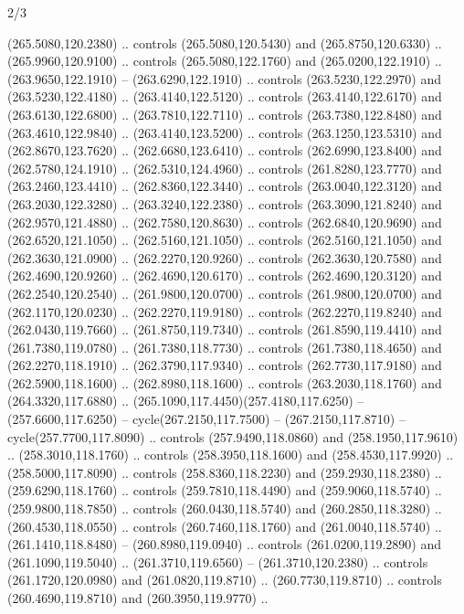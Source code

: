 \begin{flagdescription}{2/3}
\begin{scope}[xshift=0.5\flaglength,yshift=0.5\flagwidth,scale=\flagwidth/259.2]
\begin{scope}[y=0.8pt, x=0.8pt, yscale=-1,shift={(-243,-162)}]
      (265.5080,120.2380) .. controls (265.5080,120.5430) and (265.8750,120.6330) ..
      (265.9960,120.9100) .. controls (265.5080,122.1760) and (265.0200,122.1910) ..
      (263.9650,122.1910) -- (263.6290,122.1910) .. controls (263.5230,122.2970) and
      (263.5230,122.4180) .. (263.4140,122.5120) .. controls (263.4140,122.6170) and
      (263.6130,122.6800) .. (263.7810,122.7110) .. controls (263.7380,122.8480) and
      (263.4610,122.9840) .. (263.4140,123.5200) .. controls (263.1250,123.5310) and
      (262.8670,123.7620) .. (262.6680,123.6410) .. controls (262.6990,123.8400) and
      (262.5780,124.1910) .. (262.5310,124.4960) .. controls (261.8280,123.7770) and
      (263.2460,123.4410) .. (262.8360,122.3440) .. controls (263.0040,122.3120) and
      (263.2030,122.3280) .. (263.3240,122.2380) .. controls (263.3090,121.8240) and
      (262.9570,121.4880) .. (262.7580,120.8630) .. controls (262.6840,120.9690) and
      (262.6520,121.1050) .. (262.5160,121.1050) .. controls (262.5160,121.1050) and
      (262.3630,121.0900) .. (262.2270,120.9260) .. controls (262.3630,120.7580) and
      (262.4690,120.9260) .. (262.4690,120.6170) .. controls (262.4690,120.3120) and
      (262.2540,120.2540) .. (261.9800,120.0700) .. controls (261.9800,120.0700) and
      (262.1170,120.0230) .. (262.2270,119.9180) .. controls (262.2270,119.8240) and
      (262.0430,119.7660) .. (261.8750,119.7340) .. controls (261.8590,119.4410) and
      (261.7380,119.0780) .. (261.7380,118.7730) .. controls (261.7380,118.4650) and
      (262.2270,118.1910) .. (262.3790,117.9340) .. controls (262.7730,117.9180) and
      (262.5900,118.1600) .. (262.8980,118.1600) .. controls (263.2030,118.1760) and
      (264.3320,117.6880) .. (265.1090,117.4450)(257.4180,117.6250) --
      (257.6600,117.6250) -- cycle(267.2150,117.7500) -- (267.2150,117.8710) --
      cycle(257.7700,117.8090) .. controls (257.9490,118.0860) and
      (258.1950,117.9610) .. (258.3010,118.1760) .. controls (258.3950,118.1600) and
      (258.4530,117.9920) .. (258.5000,117.8090) .. controls (258.8360,118.2230) and
      (259.2930,118.2380) .. (259.6290,118.1760) .. controls (259.7810,118.4490) and
      (259.9060,118.5740) .. (259.9800,118.7850) .. controls (260.0430,118.5740) and
      (260.2850,118.3280) .. (260.4530,118.0550) .. controls (260.7460,118.1760) and
      (261.0040,118.5740) .. (261.1410,118.8480) -- (260.8980,119.0940) .. controls
      (261.0200,119.2890) and (261.1090,119.5040) .. (261.3710,119.6560) --
      (261.3710,120.2380) .. controls (261.1720,120.0980) and (261.0820,119.8710) ..
      (260.7730,119.8710) .. controls (260.4690,119.8710) and (260.3950,119.9770) ..

\end{scope}
\end{scope}
\end{flagdescription}

